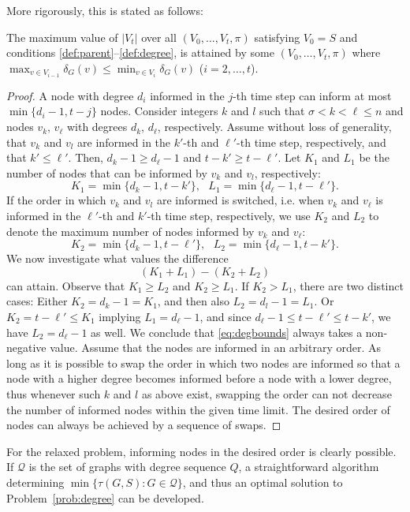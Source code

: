More rigorously, this is stated as follows:
\begin{lemma}
\label{lemma:degorder}
The maximum value of $\left|V_t\right|$ over all $\left(V_0,\ldots,V_t,\pi\right)$ satisfying $V_0=S$ and
conditions \ref{def:parent}--\ref{def:degree}, is attained by some
$\left(V_0,\ldots,V_t,\pi\right)$ where \\ $\max_{v\in V_{i-1}}\delta_G(v)\leq\min_{v\in V_i}\delta_G(v)$ ($i=2,\ldots,t$).
\end{lemma}
\begin{proof}

A node with degree $d_i$ informed in the $j$-th time step can inform at most $\min\{d_i-1,t-j\}$ nodes.
Consider integers  $k$ and $l$ such that $\sigma< k < \ell\leq n$ and nodes $v_k$, $v_\ell$ with degrees $d_k$, $d_\ell$, respectively.
Assume without loss of generality, that $v_k$ and $v_l$ are informed in the $k'$-th and $\ell'$-th time step, respectively, and that $k'\leq\ell'$.
Then, $d_k-1\geq d_\ell-1$ and $t-k' \geq t-\ell'$.
Let $K_1$ and $L_1$ be the number of nodes that can be informed by $v_k$ and $v_l$, respectively:
$$
K_1=\min\{d_k-1,t-k'\}, ~~~ L_1=\min\{d_\ell-1,t-\ell'\}.
$$
If the order in which $v_k$ and $v_l$ are informed is switched, i.e. when $v_k$ and $v_\ell$ is informed in the $\ell'$-th and $k'$-th time step, respectively, 
we use $K_2$ and $L_2$ to denote the maximum number of nodes informed by $v_k$ and $v_\ell$:
$$
K_2=\min\{d_k-1,t-\ell'\}, ~~~ L_2=\min\{d_\ell-1,t-k'\}.
$$
We now investigate what values the difference 
\begin{equation}
\label{eq:degbounds}
(K_1+L_1)-(K_2+L_2)
\end{equation}
can attain.
Observe that $K_1\geq L_2$ and $K_2\geq L_1$. 
If $K_2>L_1$, there are two distinct cases:
Either $K_2=d_k-1=K_1$, and then also $L_2=d_l-1=L_1$.
	Or $K_2=t-\ell'\leq K_1$ implying $L_1 =d_\ell-1$, and since $d_\ell-1\leq t-\ell'\leq t-k'$, we have $L_2=d_\ell-1$ as well.
We conclude that \eqref{eq:degbounds} always takes a non-negative value.
Assume that the nodes are informed in an arbitrary order.
As long as it is possible to swap the order in which two nodes are informed so that a node with a higher degree becomes informed before a node with a lower degree,
thus whenever such $k$ and $l$ as above exist, swapping the order can not decrease the number of informed nodes within the given time limit.
The desired order of nodes can always be achieved by a sequence of swaps.
\end{proof}
For the relaxed problem, informing nodes in the desired order is clearly possible.
If $\mathcal{Q}$ is the set of graphs with degree sequence $Q$, a straightforward algorithm determining
$\min\{\tau(G,S): G\in \mathcal{Q}\}$,
and thus an optimal solution to Problem~\ref{prob:degree} can be developed.

